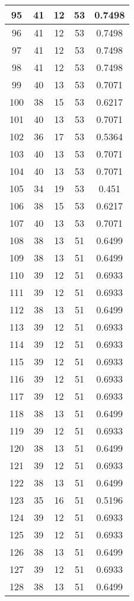 \documentclass[letterpaper, 12pt]{article}
\begin{document}
\begin{longtable}{|c|c|c|c|c|}
\hline
95 & 41 & 12 & 53 & 0.7498 \\
\hline
96 & 41 & 12 & 53 & 0.7498 \\
\hline
97 & 41 & 12 & 53 & 0.7498 \\
\hline
98 & 41 & 12 & 53 & 0.7498 \\
\hline
99 & 40 & 13 & 53 & 0.7071 \\
\hline
100 & 38 & 15 & 53 & 0.6217 \\
\hline
101 & 40 & 13 & 53 & 0.7071 \\
\hline
102 & 36 & 17 & 53 & 0.5364 \\
\hline
103 & 40 & 13 & 53 & 0.7071 \\
\hline
104 & 40 & 13 & 53 & 0.7071 \\
\hline
105 & 34 & 19 & 53 & 0.451 \\
\hline
106 & 38 & 15 & 53 & 0.6217 \\
\hline
107 & 40 & 13 & 53 & 0.7071 \\
\hline
108 & 38 & 13 & 51 & 0.6499 \\
\hline
109 & 38 & 13 & 51 & 0.6499 \\
\hline
110 & 39 & 12 & 51 & 0.6933 \\
\hline
111 & 39 & 12 & 51 & 0.6933 \\
\hline
112 & 38 & 13 & 51 & 0.6499 \\
\hline
113 & 39 & 12 & 51 & 0.6933 \\
\hline
114 & 39 & 12 & 51 & 0.6933 \\
\hline
115 & 39 & 12 & 51 & 0.6933 \\
\hline
116 & 39 & 12 & 51 & 0.6933 \\
\hline
117 & 39 & 12 & 51 & 0.6933 \\
\hline
118 & 38 & 13 & 51 & 0.6499 \\
\hline
119 & 39 & 12 & 51 & 0.6933 \\
\hline
120 & 38 & 13 & 51 & 0.6499 \\
\hline
121 & 39 & 12 & 51 & 0.6933 \\
\hline
122 & 38 & 13 & 51 & 0.6499 \\
\hline
123 & 35 & 16 & 51 & 0.5196 \\
\hline
124 & 39 & 12 & 51 & 0.6933 \\
\hline
125 & 39 & 12 & 51 & 0.6933 \\
\hline
126 & 38 & 13 & 51 & 0.6499 \\
\hline
127 & 39 & 12 & 51 & 0.6933 \\
\hline
128 & 38 & 13 & 51 & 0.6499 \\

\end{longtable}
\end{document}
